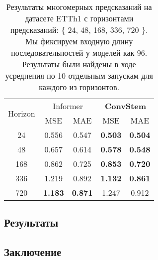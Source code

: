 \begin{table}[!ht]
    \centering
    \begin{tabular}{c  cc  cc}
    \toprule
    \multirow{2}{*}{{Horizon}} 
      & \multicolumn{2}{c}{{Informer}} 
      & \multicolumn{2}{c}{\textbf{ConvStem}} \\
    \cmidrule(lr){2-3} \cmidrule(lr){4-5}
      & {MSE} & {MAE} 
      & {MSE} & {MAE} \\
    \midrule
    24   & 0.556 & 0.547 & \textbf{0.503} & \textbf{0.504} \\
    48   & 0.657 & 0.614 & \textbf{0.578} & \textbf{0.548} \\
    168  & 0.862 & 0.725 & \textbf{0.853} & \textbf{0.720} \\
    336  & 1.219 & 0.892 & \textbf{1.132} & \textbf{0.861} \\
    720  & \textbf{1.183} & \textbf{0.871} & 1.247 & 0.912 \\
    \bottomrule
    \end{tabular}
    \caption{Результаты многомерных предсказаний на датасете ETTh1 с 
    горизонтами предсказаний: \{ 24, 48, 168, 336, 720 \}. 
    Мы фиксируем входную длину последовательностей у моделей как 96.
    Результаты были найдены в ходе усреднения по 10 отдельным запускам 
    для каждого из горизонтов.}
    \label{tab:etth1-convstem}
\end{table}



\subsection{Результаты}

\subsection{Заключение}
